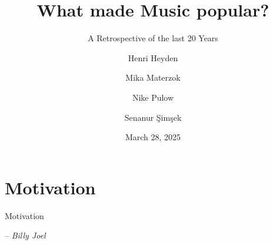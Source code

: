 


\usepackage{qrcode}
\usepackage{setspace}






\author[H. Heyden \and M. Materzok \and N. Pulow \and S. Şimşek]{Henri Heyden \and Mika Materzok \and Nike Pulow \and Senanur Şimşek}
\title{What made Music popular?}
\date{March 28, 2025}
\subtitle{A Retrospective of the last 20 Years}




\maketitle
\section{Motivation}
\begin{frame}{Motivation}
    \begin{center}
    \begin{minipage}{0.5\textwidth}
    \doublespacing
     -- \textit{Billy Joel}
    \end{minipage}
    \end{center}
\end{frame}

